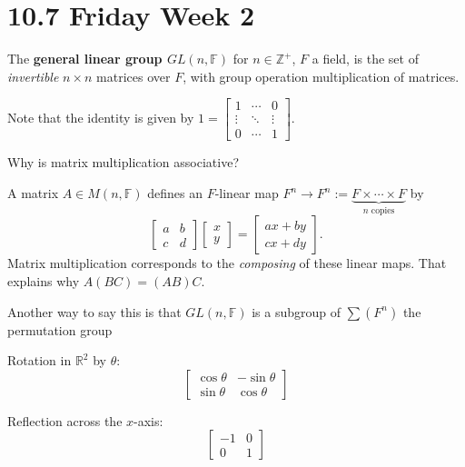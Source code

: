 \documentclass{notes}
\begin{document}
\newpage

\section{10.7 Friday Week 2}

\begin{defn}
  The {\boldmath \bfseries general linear group $GL(n, \mathbb F)$} for $n \in \mathbb Z^+$, $F$ a field, is the set of \textit{invertible} $n \times n$ matrices over $F$, with group operation multiplication of matrices.
\end{defn}

Note that the identity is given by  $1 = \begin{bmatrix} 1 & \cdots & 0 \\ \vdots & \ddots & \vdots \\ 0 & \cdots & 1 \end{bmatrix}$.

Why is matrix multiplication associative?

A matrix $A \in M(n, \mathbb F)$ defines an $F$-linear map $F^n \to F^n := \underbrace{F \times \cdots \times F}_\text{$n$ copies}$ by 
\[
  \begin{bmatrix} a & b \\ c & d \end{bmatrix} \begin{bmatrix} x \\ y \end{bmatrix} = \begin{bmatrix} a x + b y \\ c x + d y \end{bmatrix}.
\]
Matrix multiplication corresponds to the \textit{composing} of these linear maps.
That explains why $A (B C) = (A B) C$.

Another way to say this is that $GL(n, \mathbb F)$ is a subgroup of $\sum (F^n)$ the permutation group

\begin{eg}
  Rotation in $\mathbb R^2$ by $\theta$: 
  \[
    \begin{bmatrix} \cos \theta & -\sin \theta \\ \sin \theta & \cos \theta \end{bmatrix}
  \]
\end{eg}

\begin{eg}
  Reflection across the $x$-axis: 
  \[
    \begin{bmatrix} -1 & 0 \\ 0 & 1 \end{bmatrix}
  \]
\end{eg}
\end{document}
